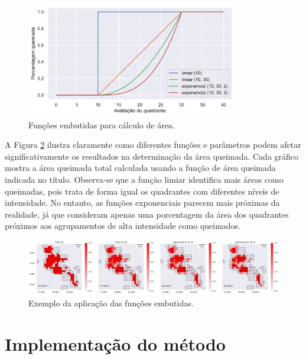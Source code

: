 \documentclass[cic,tc]{iiufrgs}
\begin{document}
\begin{figure}[H]
    \caption{Funções embutidas para cálculo de área.}
    \begin{center}
        \includegraphics[width=25em]{eval_func_built_in}
    \end{center}
    \label{fig:eval_func_built_in}
\end{figure}

A Figura \ref{fig:aplicacao_funcoes_built_in} ilustra claramente como diferentes funções e parâmetros podem afetar significativamente os resultados na determinação da área queimada. Cada gráfico mostra a área queimada total calculada usando a função de área queimada indicada no título. Observa-se que a função limiar identifica mais áreas como queimadas, pois trata de forma igual os quadrantes com diferentes níveis de intensidade. No entanto, as funções exponenciais parecem mais próximas da realidade, já que consideram apenas uma porcentagem da área dos quadrantes próximos aos agrupamentos de alta intensidade como queimados. \par

\begin{figure}[H]
    \caption{Exemplo da aplicação das funções embutidas.}
    \begin{center}
        \includegraphics[width=35em]{aplicacao_funcoes_built_in}
    \end{center}
    \label{fig:aplicacao_funcoes_built_in}
\end{figure}

\chapter{Implementação do método}
\end{document}
